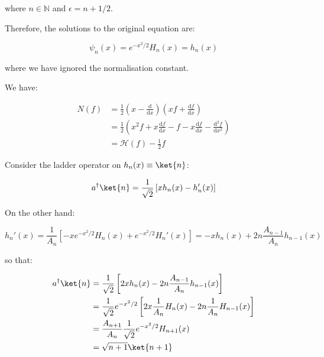 \documentclass[12pt]{article}
\begin{document}
where $n \in \mathbb{N}$ and $\epsilon = n + 1/2$.

Therefore, the solutions to the original equation are:

\begin{equation}
    \psi_{n}(x) = e^{-x^{2}/2} H_{n}(x) = h_{n}(x)
\end{equation}

where we have ignored the normalisation constant.

We have:

\begin{equation}
\begin{split}
    N(f) &= \frac{1}{2} \left( x - \frac{\mathrm{d}}{\mathrm{d}x} \right) \left( xf + \frac{\mathrm{d}f}{\mathrm{d}x} \right) \\
    &= \frac{1}{2} \left( x^{2}f + x \frac{\mathrm{d}f}{\mathrm{d}x} - f - x\frac{\mathrm{d}f}{\mathrm{d}x} - \frac{\mathrm{d}^{2}f}{\mathrm{d}x^{2}} \right) \\
    &= \mathcal{H}(f) - \frac{1}{2} f
\end{split}
\end{equation}

Consider the ladder operator on $h_{n}(x) \equiv \ket{n}$:

\begin{equation}
    a^{\dagger} \ket{n} = \frac{1}{\sqrt{2}} \left[ x h_{n}(x) - h_{n}'(x) \right]
\end{equation}

On the other hand:

\begin{equation}
    h_{n}'(x) = \frac{1}{A_{n}} \left[ -x e^{-x^{2}/2} H_{n}(x) + e^{-x^{2}/2} H_{n}'(x) \right] = -x h_{n}(x) + 2n \frac{A_{n-1}}{A_{n}} h_{n-1}(x)
\end{equation}

so that:

\begin{equation}
\begin{split}
    a^{\dagger} \ket{n} &= \frac{1}{\sqrt{2}} \left[ 2x h_{n}(x) - 2n \frac{A_{n-1}}{A_{n}} h_{n-1}(x) \right] \\
    &= \frac{1}{\sqrt{2}} e^{-x^{2}/2} \left[ 2x \frac{1}{A_{n}} H_{n}(x) - 2n \frac{1}{A_{n}} H_{n-1}(x) \right] \\
    &= \frac{A_{n+1}}{A_{n}} \frac{1}{\sqrt{2}} e^{-x^{2}/2} H_{n+1}(x) \\
    &= \sqrt{n+1} \ket{n+1}
\end{split}
\end{equation}
\end{document}
